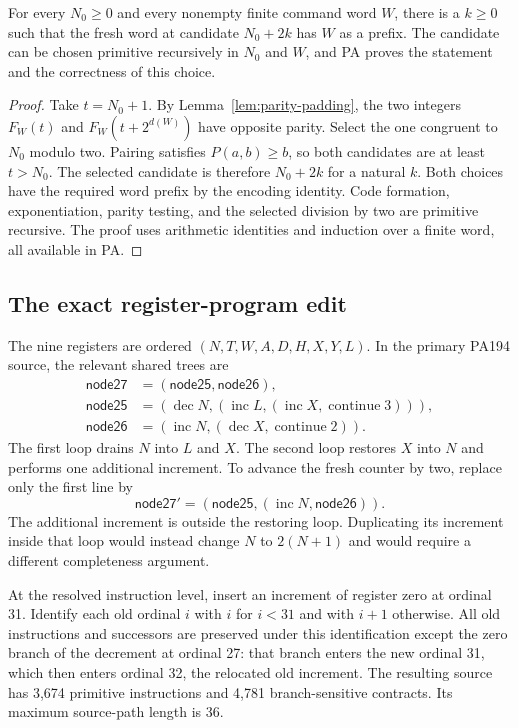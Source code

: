 \begin{theorem}
\label{thm:sparse-prefix}
For every $N_0\geq0$ and every nonempty finite command word $W$, there
is a $k\geq0$ such that the fresh word at candidate $N_0+2k$ has $W$
as a prefix. The candidate can be chosen primitive recursively in
$N_0$ and $W$, and PA proves the statement and the correctness of this
choice.
\end{theorem}
\begin{proof}
Take $t=N_0+1$. By Lemma~\ref{lem:parity-padding}, the two integers
$F_W(t)$ and $F_W(t+2^{d(W)})$ have opposite parity. Select the one
congruent to $N_0$ modulo two. Pairing satisfies $P(a,b)\geq b$,
so both candidates are at least $t>N_0$. The selected candidate is
therefore $N_0+2k$ for a natural $k$. Both choices have the required
word prefix by the encoding identity. Code formation, exponentiation,
parity testing, and the selected division by two are primitive recursive.
The proof uses arithmetic identities and induction over a finite word,
all available in PA.
\end{proof}

\subsection{The exact register-program edit}

The nine registers are ordered $(N,T,W,A,D,H,X,Y,L)$. In the primary
PA194 source, the relevant shared trees are
\[
\begin{aligned}
 \mathsf{node27}&=(\mathsf{node25},\mathsf{node26}),\\
 \mathsf{node25}&=(\operatorname{dec}N,
        (\operatorname{inc}L,(\operatorname{inc}X,\operatorname{continue}3))),\\
 \mathsf{node26}&=(\operatorname{inc}N,
        (\operatorname{dec}X,\operatorname{continue}2)).
\end{aligned}
\]
The first loop drains $N$ into $L$ and $X$. The second loop restores
$X$ into $N$ and performs one additional increment. To advance the fresh
counter by two, replace only the first line by
\[
 \mathsf{node27}'=(\mathsf{node25},
          (\operatorname{inc}N,\mathsf{node26})).
\]
The additional increment is outside the restoring loop. Duplicating
its increment inside that loop would instead change $N$ to $2(N+1)$
and would require a different completeness argument.

At the resolved instruction level, insert an increment of register zero
at ordinal 31. Identify each old ordinal $i$ with $i$ for $i<31$ and
with $i+1$ otherwise. All old instructions and successors are preserved
under this identification except the zero branch of the decrement at
ordinal 27: that branch enters the new ordinal 31, which then enters
ordinal 32, the relocated old increment. The resulting source has
3,674 primitive instructions and 4,781 branch-sensitive contracts.
Its maximum source-path length is 36.

